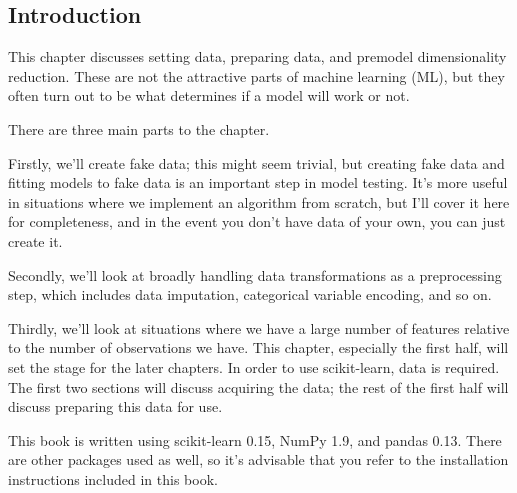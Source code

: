 \subsection{Introduction}
This chapter discusses setting data, preparing data, and premodel dimensionality reduction.
These are not the attractive parts of machine learning (ML), but they often turn out to be
what determines if a model will work or not.

There are three main parts to the chapter. 

Firstly, we'll create fake data; this might seem
trivial, but creating fake data and fitting models to fake data is an important step in model
testing. It's more useful in situations where we implement an algorithm from scratch, but I'll
cover it here for completeness, and in the event you don't have data of your own, you can just
create it. 

Secondly, we'll look at broadly handling data transformations as a preprocessing
step, which includes data imputation, categorical variable encoding, and so on. 

Thirdly,
we'll look at situations where we have a large number of features relative to the number of
observations we have.
This chapter, especially the first half, will set the stage for the later chapters. In order to use
scikit-learn, data is required. The first two sections will discuss acquiring the data; the rest of
the first half will discuss preparing this data for use.

This book is written using scikit-learn 0.15, NumPy 1.9, and pandas 0.13.
There are other packages used as well, so it's advisable that you refer to
the installation instructions included in this book.
